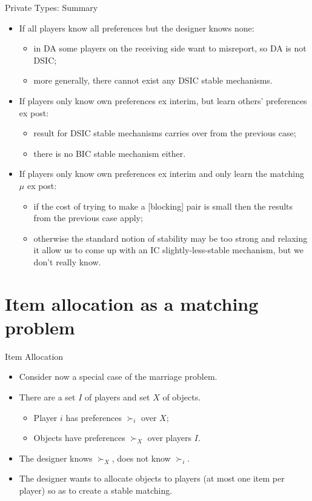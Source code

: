 \documentclass[english,10pt
,aspectratio=169
]{beamer}
\begin{document}
\begin{frame}{Private Types: Summary}
\begin{itemize}
	\item If all players know all preferences but the designer knows none:
	\begin{itemize}
		\item in DA some players on the receiving side want to misreport, so DA is not DSIC;
		\item more generally, there cannot exist any DSIC stable mechanisms.
	\end{itemize}
	\item If players only know own preferences ex interim, but learn others' preferences ex post:
	\begin{itemize}
		\item result for DSIC stable mechanisms carries over from the previous case;
		\item there is no BIC stable mechanism either.
	\end{itemize}
	\item If players only know own preferences ex interim and only learn the matching $\mu$ ex post:
	\begin{itemize}
		\item if the cost of trying to make a [blocking] pair is small then the results from the previous case apply;
		\item otherwise the standard notion of stability may be too strong and relaxing it  allow us to come up with an IC slightly-less-stable mechanism, but we don't really know.
	\end{itemize}
\end{itemize}
\end{frame}


\section{Item allocation as a matching problem}

\begin{frame}{Item Allocation}
\begin{itemize}
	\item Consider now a special case of the marriage problem.
	\item There are a set $I$ of players and set $X$ of objects.
	\begin{itemize}
		\item Player $i$ has preferences $\succ_i$ over $X$;
		\item Objects have  preferences $\succ_X$ over players $I$.
	\end{itemize}
	\item The designer knows $\succ_X$, does not know $\succ_i$.
	\item The designer wants to allocate objects to players (at most one item per player) so as to create a stable matching.
\end{itemize}
\end{frame}
\end{document}
